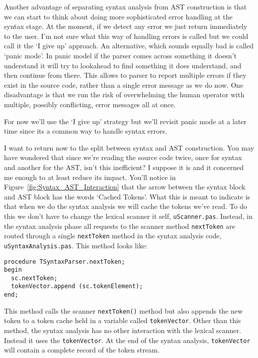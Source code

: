 Another advantage of separating syntax analysis from AST construction is that we can start to think about doing more sophisticated error handling at the syntax stage. At the moment, if we detect any error we just return immediately to the user. I'm not sure what this way of handling errors is called but we could call it the `I give up' approach. An alternative, which sounds equally bad is called `panic mode'. In panic model if the parser comes across something it doesn't understand it will try to lookahead to find something it does understand, and then continue from there. This allows to parser to report multiple errors if they exist in the source code, rather than a single error message as we do now. One disadvantage is that we run the risk of overwhelming the human operator with multiple, possibly conflicting, error messages all at once.

For now we'll use the `I give up' strategy but we'll revisit panic mode at a later time since its a common way to handle syntax errors.

I want to return now to the split between syntax and AST construction. You may have wondered that since we're reading the source code twice, once for syntax and another for the AST, isn't this inefficient? I suppose it is and it concerned me enough to at least reduce its impact. You'll notice in Figure~\ref{fig:Syntax_AST_Interaction} that the arrow between the syntax block and AST block has the words `Cached Tokens'. What this is meant to indicate is that when we do the syntax analysis we will cache the tokens we've read. To do this we don't have to change the lexical scanner it self, {\tt uScanner.pas}. Instead, in the syntax analysis phase all requests to the scanner method {\tt nextToken} are routed through a single {\tt nextToken} method in the syntax analysis code, {\tt uSyntaxAnalysis.pas}. This method looks like:

\begin{lstlisting}
procedure TSyntaxParser.nextToken;
begin
  sc.nextToken;
  tokenVector.append (sc.tokenElement);
end;
\end{lstlisting}

This method calls the scanner {\tt nextToken()} method but also appends the new token to a token cache held in a variable called {\tt tokenVector}. Other than this method, the syntax analysis has no other interaction with the lexical scanner. Instead it uses the {\tt tokenVector}. At the end of the syntax analysis, {\tt tokenVector} will contain a complete record of the token stream.

